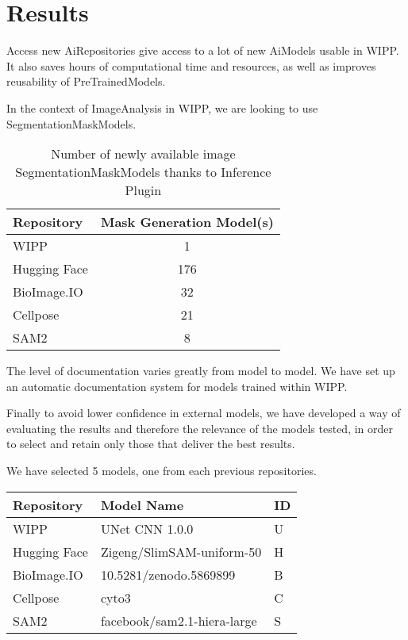\section{Results}
\label{sec:results}

Access new \Gls{AiRepositories} give access to a lot of new \Gls{AiModel}s
usable in \Gls{WIPP}. It also saves hours of computational time and
resources, as well as improves reusability of \Gls{PreTrainedModel}s.

In the context of \Gls{ImageAnalysis} in \Gls{WIPP}, we are looking to
use \Gls{SegmentationMaskModel}s.

\begin{table}[H]
\centering
\caption{\label{tab:number_of_newly_available_models}%
  Number of newly available image \Gls{SegmentationMaskModel}s thanks to Inference Plugin
}
\begin{tabular}{lc}
  \toprule
  Repository & Mask Generation Model(s) \\
  \midrule
  WIPP & 1 \\
  Hugging Face & 176 \\
  BioImage.IO & 32 \\
  Cellpose & 21 \\
  SAM2 & 8 \\
  \bottomrule
\end{tabular}
\end{table}

The level of documentation varies greatly from model to model. We have set up an
automatic documentation system for models trained within \Gls{WIPP}.

Finally to avoid lower confidence in external models, we have developed a way of
evaluating the results and therefore the relevance of the models tested, in
order to select and retain only those that deliver the best results.

We have selected 5 models, one from each previous repositories.

\begin{table}[H]
\centering
\begin{tabular}{lll}
  \toprule
  Repository & Model Name & ID \\
  \midrule
  WIPP & UNet CNN 1.0.0 & U \\
  Hugging Face & Zigeng/SlimSAM-uniform-50 & H \\
  BioImage.IO & 10.5281/zenodo.5869899 & B \\
  Cellpose & cyto3 & C \\
  SAM2 & facebook/sam2.1-hiera-large & S \\
  \bottomrule
\end{tabular}
\end{table}

